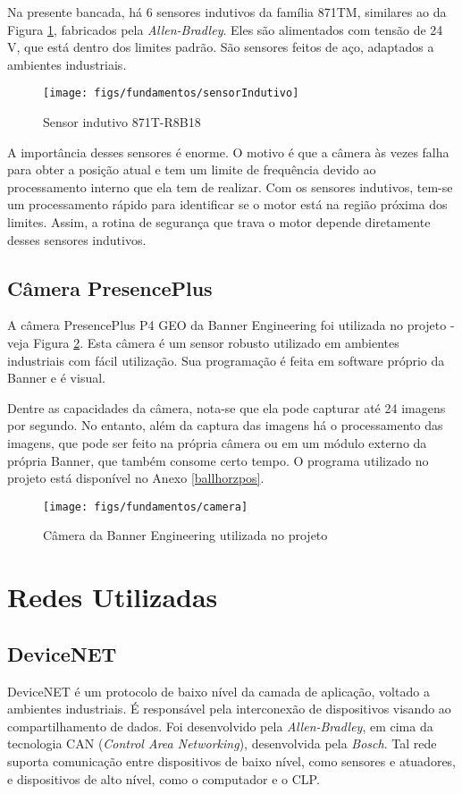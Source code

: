 Na presente bancada, há 6 sensores indutivos da família 871TM, similares ao da Figura \ref{sensorIndutivo}, fabricados pela \textit{Allen-Bradley}. Eles são alimentados com tensão de 24 V, que está dentro dos limites padrão. São sensores feitos de aço, adaptados a ambientes industriais.

\begin{figure}[!ht]
  \centering
    \texttt{[image: figs/fundamentos/sensorIndutivo]}
    \caption{Sensor indutivo 871T-R8B18 \cite{redytton}\label{sensorIndutivo}}
\end{figure}

A importância desses sensores é enorme. O motivo é que a câmera às vezes falha para obter a posição atual e tem um limite de frequência devido ao processamento interno que ela tem de realizar. Com os sensores indutivos, tem-se um processamento rápido para identificar se o motor está na região próxima dos limites. Assim, a rotina de segurança que trava o motor depende diretamente desses sensores indutivos.

\subsection{Câmera PresencePlus}

A câmera PresencePlus P4 GEO da Banner Engineering foi utilizada no projeto - veja Figura \ref{cameraBanner}. Esta câmera é um sensor robusto utilizado em ambientes industriais com fácil utilização. Sua programação é feita em software próprio da Banner e é visual.

Dentre as capacidades da câmera, nota-se que ela pode capturar até 24 imagens por segundo. No entanto, além da captura das imagens há o processamento das imagens, que pode ser feito na própria câmera ou em um módulo externo da própria Banner, que também consome certo tempo. O programa utilizado no projeto está disponível no Anexo \ref{ballhorzpos}.

\begin{figure}[!ht]
  \centering
    \texttt{[image: figs/fundamentos/camera]}
    \caption{Câmera da Banner Engineering utilizada no projeto \cite{redytton}\label{cameraBanner}}
\end{figure}

\section{Redes Utilizadas}
\subsection{DeviceNET}
DeviceNET é um protocolo de baixo nível da camada de aplicação, voltado a ambientes industriais. É responsável pela interconexão de dispositivos visando ao compartilhamento de dados. Foi desenvolvido pela \textit{Allen-Bradley}, em cima da tecnologia CAN (\textit{Control Area Networking}), desenvolvida pela \textit{Bosch}. Tal rede suporta comunicação entre dispositivos de baixo nível, como sensores e atuadores, e dispositivos de alto nível, como o computador e o CLP. 

